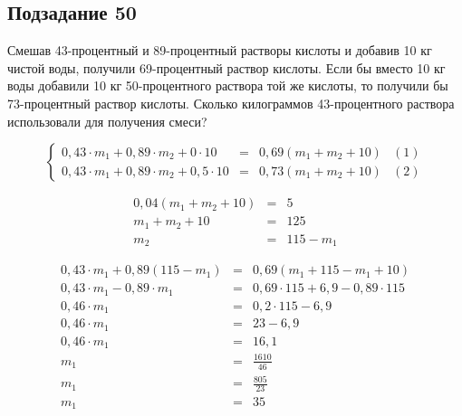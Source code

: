 \subsection*{Подзадание 50}

Смешав 43-процентный и 89-процентный растворы кислоты и добавив 10 кг чистой воды, получили 69-процентный раствор кислоты. Если бы вместо 10 кг воды добавили 10 кг 50-процентного раствора той же кислоты, то получили бы 73-процентный раствор кислоты. Сколько килограммов 43-процентного раствора использовали для получения смеси?

\begin{equation*}
    \left\{
    \begin{array}{lclr}
        0,43 \cdot m_1 + 0,89 \cdot m_2 + 0 \cdot 10   & = & 0,69 (m_1 + m_2 + 10) & (1) \\
        0,43 \cdot m_1 + 0,89 \cdot m_2 + 0,5 \cdot 10 & = & 0,73 (m_1 + m_2 + 10) & (2)
    \end{array}
    \right.
\end{equation*}

\begin{equation*}
    \begin{array}{rcl}
        0,04(m_1 + m_2 + 10) & = & 5         \\
        m_1 + m_2 + 10       & = & 125       \\
        m_2                  & = & 115 - m_1
    \end{array}
\end{equation*}

\begin{equation*}
    \begin{array}{rcl}
        0,43 \cdot m_1  + 0,89 (115 - m_1) & = & 0,69 (m_1 + 115 - m_1 + 10)           \\
        0,43 \cdot m_1 - 0,89 \cdot m_1    & = & 0,69 \cdot 115 + 6,9 - 0,89 \cdot 115 \\
        0,46 \cdot m_1                     & = & 0,2 \cdot 115 - 6,9                   \\
        0,46 \cdot m_1                     & = & 23 - 6,9                              \\
        0,46 \cdot m_1                     & = & 16,1                                  \\
        m_1                                & = & \frac{1610}{46}                       \\
        m_1                                & = & \frac{805}{23}                        \\
        m_1                                & = & 35                                    \\
    \end{array}
\end{equation*}

